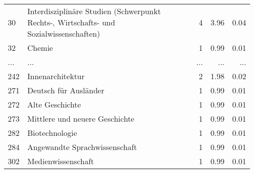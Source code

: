 \begin{longtable}{lXrrr}
        30 & \multicolumn{1}{X}{Interdisziplinäre Studien (Schwerpunkt Rechts-, Wirtschafts- und Sozialwissenschaften)} & %
          \num{4} &
          \num[round-mode=places,round-precision=2]{3,96} &
          \num[round-mode=places,round-precision=2]{0,04} \\
        32 & \multicolumn{1}{X}{Chemie} & %
          \num{1} &
          \num[round-mode=places,round-precision=2]{0,99} &
          \num[round-mode=places,round-precision=2]{0,01} \\
       ... & ... & ... & ... & ... \\
        242 & \multicolumn{1}{X}{Innenarchitektur} & %
          \num{2} &
          \num[round-mode=places,round-precision=2]{1,98} &
          \num[round-mode=places,round-precision=2]{0,02} \\

        271 & \multicolumn{1}{X}{Deutsch für Ausländer} & %
          \num{1} &
          \num[round-mode=places,round-precision=2]{0,99} &
          \num[round-mode=places,round-precision=2]{0,01} \\

        272 & \multicolumn{1}{X}{Alte Geschichte} & %
          \num{1} &
          \num[round-mode=places,round-precision=2]{0,99} &
          \num[round-mode=places,round-precision=2]{0,01} \\

        273 & \multicolumn{1}{X}{Mittlere und neuere Geschichte} & %
          \num{1} &
          \num[round-mode=places,round-precision=2]{0,99} &
          \num[round-mode=places,round-precision=2]{0,01} \\

        282 & \multicolumn{1}{X}{Biotechnologie} & %
          \num{1} &
          \num[round-mode=places,round-precision=2]{0,99} &
          \num[round-mode=places,round-precision=2]{0,01} \\

        284 & \multicolumn{1}{X}{Angewandte Sprachwissenschaft} & %
          \num{1} &
          \num[round-mode=places,round-precision=2]{0,99} &
          \num[round-mode=places,round-precision=2]{0,01} \\

        302 & \multicolumn{1}{X}{Medienwissenschaft} & %
          \num{1} &
          \num[round-mode=places,round-precision=2]{0,99} &
          \num[round-mode=places,round-precision=2]{0,01} \\


\end{longtable}

